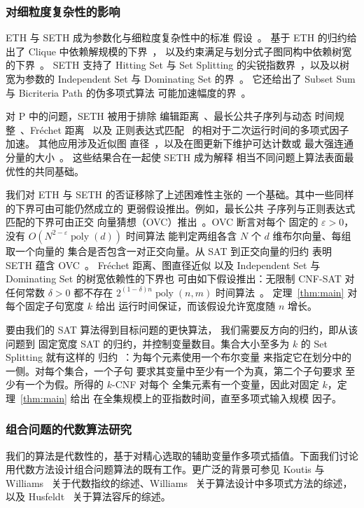 \documentclass[11pt,reqno]{amsart}
\numberwithin{equation}{section}
\theoremstyle{definition}\newtheorem{definition}[theorem]{定义}
\theoremstyle{remark}\newtheorem{remark}[theorem]{注}
\newcommand{\poly}{\operatorname{poly}}
\begin{document}
\subsubsection{对细粒度复杂性的影响}\label{subsec:related-consequences}
ETH 与 SETH 成为参数化与细粒度复杂性中的标准
假设~\cite{IPZ,VW19}。
基于 ETH 的归约给出了 Clique 中依赖解规模的下界~\cite{CHKX06}，
以及约束满足与划分式子图同构中依赖树宽的下界~\cite{Marx10}。
SETH 支持了 Hitting Set 与 Set
Splitting 的尖锐指数界~\cite{CDL16}，以及以树宽为参数的
Independent Set 与 Dominating Set 的界~\cite{LMS18}。
它还给出了 Subset Sum 与 Bicriteria Path 的伪多项式算法
可能加速幅度的界~\cite{ABHS19}。

对 $\mathrm P$ 中的问题，SETH 被用于排除
编辑距离~\cite{BackursIndyk18}、最长公共子序列与动态
时间规整~\cite{BK15}、Fr\'echet 距离~\cite{Bri14} 以及
正则表达式匹配~\cite{BI16} 的相对于二次运行时间的多项式因子加速。
其他应用涉及近似图
直径~\cite{RV13}，以及在图更新下维护可达计数或
最大强连通分量的大小~\cite{AW14}。
这些结果合在一起使 SETH 成为解释
相当不同问题上算法表面最优性的共同基础。

我们对 ETH 与 SETH 的否证移除了上述困难性主张的
一个基础。其中一些同样的下界可由可能仍然成立的
更弱假设推出。例如，最长公共
子序列与正则表达式匹配的下界可由正交
向量猜想（OVC）推出~\cite{BK15,BI16}。OVC 断言对每个
固定的 $\varepsilon>0$，没有 $O(N^{2-\varepsilon}\poly(d))$ 时间算法
能判定两组各含 $N$ 个 $d$ 维布尔向量、每组取一个向量的
集合是否包含一对正交向量。从 SAT 到正交向量的归约
表明 SETH 蕴含 OVC~\cite{Wil05,VW19}。
Fr\'echet 距离、图直径近似
以及 Independent Set 与 Dominating Set 的树宽依赖性的下界也
可由如下假设推出：无限制 CNF-SAT 对任何常数
$\delta>0$ 都不存在 $2^{(1-\delta)n}\poly(n,m)$ 时间算法~\cite{Bri14,RV13,LMS18}。
定理~\ref{thm:main} 对每个固定子句宽度 $k$ 给出
运行时间保证，而该假设允许宽度随 $n$ 增长。

要由我们的 SAT 算法得到目标问题的更快算法，
我们需要反方向的归约，即从该问题到
固定宽度 SAT 的归约，并控制变量数目。集合大小至多为 $k$ 的
Set Splitting 就有这样的
归约~\cite[观察~3.6]{CDL16}：为每个元素使用一个布尔变量
来指定它在划分中的一侧。对每个集合，一个子句
要求其变量中至少有一个为真，第二个子句要求
至少有一个为假。所得的 $k$-CNF 对每个
全集元素有一个变量，因此对固定 $k$，定理~\ref{thm:main} 给出
在全集规模上的亚指数时间，直至多项式输入规模
因子。

\subsubsection{组合问题的代数算法研究}\label{subsec:related-algebraic}
我们的算法是代数性的，基于对精心选取的辅助变量作多项式插值。下面我们讨论用代数方法设计组合问题算法的既有工作。更广泛的背景可参见 Koutis 与
Williams~\cite{KW16} 关于代数指纹的综述、Williams~\cite{Wil14}
关于算法设计中多项式方法的综述，以及
Husfeldt~\cite{Hus11} 关于算法容斥的综述。
\end{document}
